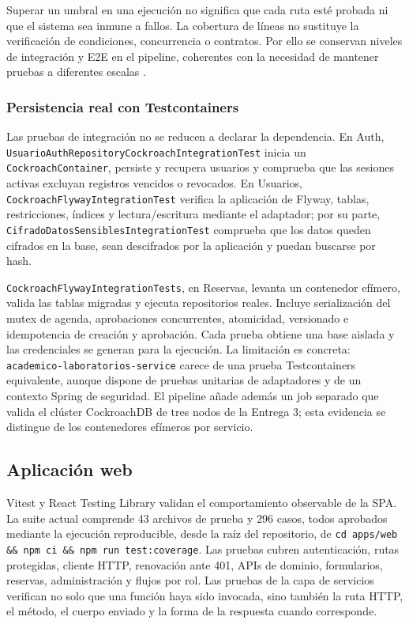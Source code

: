 Superar un umbral en una ejecución no significa que cada ruta esté probada ni
que el sistema sea inmune a fallos. La cobertura de líneas no sustituye la
verificación de condiciones,
concurrencia o contratos. Por ello se conservan niveles de integración y E2E en
el pipeline, coherentes con la necesidad de mantener pruebas a diferentes
escalas \cite{winters2020softwareengineeringgoogle}.

\subsubsection{Persistencia real con Testcontainers}

Las pruebas de integración no se reducen a declarar la dependencia. En Auth,
\texttt{UsuarioAuthRepositoryCockroachIntegrationTest} inicia un
\texttt{CockroachContainer}, persiste y recupera usuarios y comprueba que las
sesiones activas excluyan registros vencidos o revocados. En Usuarios,
\texttt{CockroachFlywayIntegrationTest} verifica la aplicación de Flyway,
tablas, restricciones, índices y lectura/escritura mediante el adaptador; por
su parte, \texttt{CifradoDatosSensiblesIntegrationTest} comprueba que los datos
queden cifrados en la base, sean descifrados por la aplicación y puedan buscarse
por hash.

\texttt{CockroachFlywayIntegrationTests}, en Reservas, levanta un contenedor
efímero, valida las tablas migradas y ejecuta repositorios reales. Incluye
serialización del mutex de agenda, aprobaciones concurrentes, atomicidad,
versionado e idempotencia de creación y aprobación. Cada prueba obtiene una base
aislada y las credenciales se generan para la ejecución. La limitación es
concreta: \texttt{academico-laboratorios-service} carece de una prueba
Testcontainers equivalente, aunque dispone de pruebas unitarias de adaptadores y
de un contexto Spring de seguridad. El pipeline añade además un job separado que
valida el clúster CockroachDB de tres nodos de la Entrega 3; esta evidencia se
distingue de los contenedores efímeros por servicio.

\subsection{Aplicación web}
\label{subsec:pruebas-web}

Vitest y React Testing Library validan el comportamiento observable de la SPA.
La suite actual comprende 43 archivos de prueba y 296 casos, todos aprobados
mediante la ejecución reproducible, desde la raíz del repositorio, de
\texttt{cd apps/web \&\& npm ci \&\& npm run test:coverage}. Las pruebas cubren autenticación,
rutas protegidas, cliente HTTP, renovación ante 401, APIs de dominio,
formularios, reservas, administración y flujos por rol. Las pruebas de la capa
de servicios verifican no solo que una función haya sido invocada, sino también
la ruta HTTP, el método, el cuerpo enviado y la forma de la respuesta cuando
corresponde.

